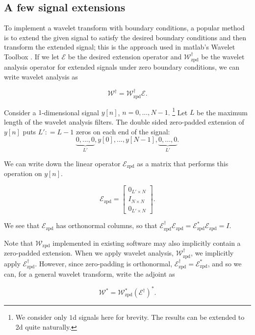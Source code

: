 \documentclass[journal]{IEEEtran}
\newcommand{\defeq}{\mathrel{\mathop:}=}
\begin{document}
\subsection{A few signal extensions}
To implement a wavelet transform with boundary conditions, a popular method is to extend the given signal to satisfy the desired boundary conditions and then transform the extended signal; this is the approach used in {\sc matlab}'s Wavelet Toolbox \cite{matlab_wt_2015}.  If we let $\mathcal{E}$ be the desired extension operator and $\mathcal{W}^\dagger_\text{zpd}$ be the wavelet analysis operator for extended signals under zero boundary conditions, we can write wavelet analysis as 

\[ \mathcal{W}^\dagger = \mathcal{W}^\dagger_\text{zpd}\mathcal{E}. \] 

Consider a $1$-dimensional signal $y[n]$, $n=0,...,N-1$.  \footnote{We consider only $1$d signals here for brevity.  The results can be extended to 2d quite naturally.}  Let $L$ be the maximum length of the wavelet analysis filters.  The double sided zero-padded extension of $y[n]$ puts $L'\defeq L-1$ zeros on each end of the signal:
\[ \underbrace{0, ..., 0}_{L'}, y[0], ..., y[N-1], \underbrace{0, ..., 0}_{L'}. \]

\noindent We can write down the linear operator $\mathcal{E}_\text{zpd}$ as a matrix that performs this operation on $y[n]$.

\[ \mathcal{E}_\text{zpd} = \begin{bmatrix} 0_{L'\times N}\\ I_{N\times N}\\ 0_{L'\times N}\end{bmatrix}. \] 

   \noindent We see that $\mathcal{E}_\text{zpd}$ has orthonormal columns, so that ${\mathcal{E}_\text{zpd}^\dagger\mathcal{E}_\text{zpd} = \mathcal{E}_\text{zpd}^\ast\mathcal{E}_\text{zpd}=I}$.

   Note that $\mathcal{W}_\text{zpd}$ implemented in existing software may also implicitly contain a zero-padded extension.  When we apply wavelet analysis, $\mathcal{W}_\text{zpd}^\dagger$, we implicitly apply $\mathcal{E}_\text{zpd}^\dagger$.  However, since zero-padding is orthonormal, $\mathcal{E}_\text{zpd}^\dagger=\mathcal{E}_\text{zpd}^\ast$, and so we can, for a general wavelet transform, write the adjoint as 

\begin{equation}
\label{eq:wzpd_adjoint}
\mathcal{W}^\ast = \mathcal{W}_\text{zpd}^\ast\left(\mathcal{E}^\dagger\right)^\ast.
\end{equation}
\end{document}
